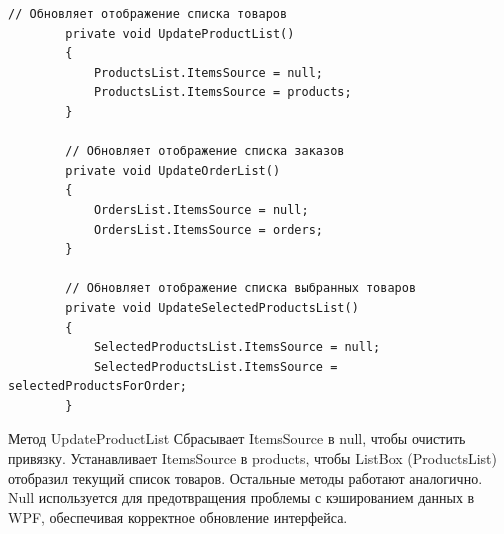 \documentclass[12pt]{article}
\newcommand{\colorGIT}[1]{\textcolor{CtpGreen}{#1}}
\begin{document}
\begin{lstlisting}[style=csharp_catppuccin, caption=\colorGIT{\href{https://github.com/WebMasterIT/Csharp_Labs/blob/ec375afd16c0647b337cf3d8a79c8bef904fc1be/3lab/StoreManager/MainWindow.xaml.cs\#L32-L51}{Методы}} обновления данных, label=lst:Method]
        // Обновляет отображение списка товаров
        private void UpdateProductList()
        {
            ProductsList.ItemsSource = null;
            ProductsList.ItemsSource = products;
        }

        // Обновляет отображение списка заказов
        private void UpdateOrderList()
        {
            OrdersList.ItemsSource = null;
            OrdersList.ItemsSource = orders;
        }

        // Обновляет отображение списка выбранных товаров
        private void UpdateSelectedProductsList()
        {
            SelectedProductsList.ItemsSource = null;
            SelectedProductsList.ItemsSource = selectedProductsForOrder;
        }
\end{lstlisting}

Метод UpdateProductList Сбрасывает ItemsSource в null, чтобы очистить привязку. Устанавливает ItemsSource в products, чтобы ListBox (ProductsList) отобразил текущий список товаров. Остальные методы работают аналогично. Null используется для предотвращения проблемы с кэшированием данных в WPF, обеспечивая корректное обновление интерфейса.

\newpage
\end{document}
